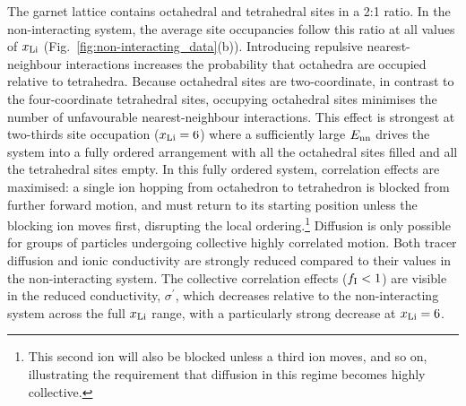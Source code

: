 \documentclass[aps,prb,twocolumn,superscriptaddress,reprint]{revtex4-1}
\newcommand{\xLi}{x_\m{Li}}
\begin{document}
The garnet lattice contains octahedral and tetrahedral sites in a 2:1 ratio. In the non-interacting system, the average site occupancies follow this ratio at all values of $\xLi$ (Fig.~\ref{fig:non-interacting_data}(b)). Introducing repulsive nearest-neighbour interactions increases the probability that octahedra are occupied relative to tetrahedra. Because octahedral sites are two-coordinate, in contrast to the four-coordinate tetrahedral sites,  occupying octahedral sites minimises the number of unfavourable nearest-neighbour interactions. This effect is strongest at two-thirds site occupation ($\xLi=6$) where a sufficiently large $E_{\mathrm{nn}}$ drives the system into a fully ordered arrangement with all the octahedral sites filled and all the tetrahedral sites empty. 
In this fully ordered system, correlation effects are maximised: a single ion hopping from octahedron to tetrahedron is blocked from further forward motion, and must return to its starting position unless the blocking ion moves first, disrupting the local ordering.\footnote{This second ion will also be blocked unless a third ion moves, and so on, illustrating the requirement that diffusion in this regime becomes highly collective.} Diffusion is only possible for groups of particles undergoing collective highly correlated motion.\cite{MorganAndMadden_PhysRevLett2014,BurbanoEtAl_PhysRevLett2016} Both tracer diffusion and ionic conductivity are strongly reduced compared to their values in the non-interacting system. The collective correlation effects ($f_{\mathrm{I}}<1$) are visible in the reduced conductivity, $\sigma^\prime$, which decreases relative to the non-interacting system across the full $\xLi$ range, with a particularly strong decrease at $\xLi=6$.
\end{document}
